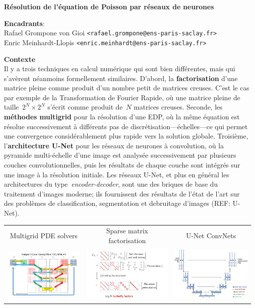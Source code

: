 \documentclass[a4paper,11pt]{article}
\begin{document}
\thispagestyle{empty}

{\bf
	Résolution de l'équation de Poisson par réseaux de neurones
}

{\bf Encadrants}:\\
Rafael Grompone von Gioi \verb+<rafael.grompone@ens-paris-saclay.fr>+\\
Enric Meinhardt-Llopis \verb+<enric.meinhardt@ens-paris-saclay.fr>+

{\bf Contexte}\\
Il y a trois techniques en calcul numérique qui sont bien différentes, mais qui
s'avèrent néanmoins formellement similaires.  D'abord, la {\bf factorisation}
d'une matrice pleine comme produit d'un nombre petit de matrices creuses.
C'est le cas par exemple de la Transformation de Fourier Rapide, où une matrice
pleine de taille~$2^N\times2^N$ s'écrit comme produit de~$N$ matrices creuses.
Seconde, les {\bf méthodes multigrid} pour la résolution d'une EDP, où la même
équation est résolue successivement à différents pas de
discrétisation---échelles---ce qui permet une convergence considérablement plus
rapide vers la solution globale.  Troisième, l'{\bf architecture U-Net} pour
les réseaux de neurones à convolution, où la pyramide multi-échelle d'une image
est analysée successivement par plusieurs couches convolutionnelles, puis les
résultats de chaque couche sont intégrés sur une image à la résolution
initiale.  Les réseaux U-Net, et plus en général les
architectures du type~\emph{encoder-decoder}, sont une des briques de base du
traitement d'images moderne; ils fournissent des résultats de l'état de l'art
sur des problèmes de classification, segmentation et debruitage d'images (REF:
U-Net).

\begin{tabular}{ccc}
	\sf\color{blue} Multigrid PDE solvers&
	\sf\color{blue} Sparse matrix factorisation &
	\sf\color{blue} U-Net ConvNets\\
	\includegraphics[width=0.3\linewidth]{f/multigrid.png} &
	\includegraphics[width=0.32\linewidth]{f/butterflies.png} &
	\includegraphics[width=0.32\linewidth]{f/cunet.png} \\
\end{tabular}
\end{document}
